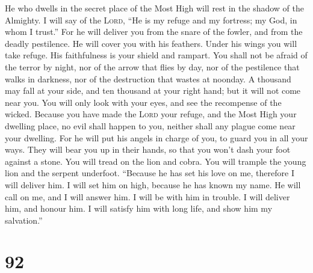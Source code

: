  He who dwells in the secret place of the Most High will
rest in the shadow of the Almighty.  I will say of the
\textsc{Lord}, ``He is my refuge and my fortress; my God, in whom I
trust.''  For he will deliver you from the snare of the
fowler, and from the deadly pestilence.  He will cover you
with his feathers. Under his wings you will take refuge. His
faithfulness is your shield and rampart.  You shall not be
afraid of the terror by night, nor of the arrow that flies by day,
 nor of the pestilence that walks in darkness, nor of the
destruction that wastes at noonday.  A thousand may fall
at your side, and ten thousand at your right hand; but it will not come
near you.  You will only look with your eyes, and see the
recompense of the wicked.  Because you have made the
\textsc{Lord} your refuge, and the Most High your dwelling place,
 no evil shall happen to you, neither shall any plague
come near your dwelling.  For he will put his angels in
charge of you, to guard you in all your ways.  They will
bear you up in their hands, so that you won't dash your foot against a
stone.  You will tread on the lion and cobra. You will
trample the young lion and the serpent underfoot. 
``Because he has set his love on me, therefore I will deliver him. I
will set him on high, because he has known my name.  He
will call on me, and I will answer him. I will be with him in trouble. I
will deliver him, and honour him.  I will satisfy him
with long life, and show him my salvation.''

\hypertarget{section-91}{%
\section{92}\label{section-91}}

